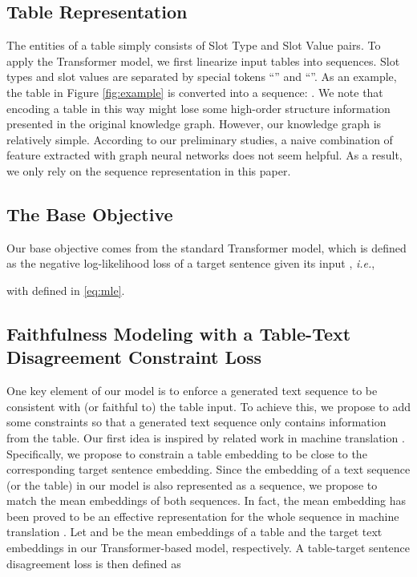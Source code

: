 \documentclass[11pt,a4paper]{article}
\begin{document}
\subsection{Table Representation}
The entities of a table simply consists of Slot Type and Slot Value pairs. 
To apply the Transformer model, we first linearize input tables into sequences. Slot types and slot values are separated by special tokens  ``'' and ``''. As an example, the table in Figure \ref{fig:example} is converted into a sequence: . 
We note that encoding a table in this way might lose some high-order structure information presented in the original knowledge graph. However, our knowledge graph is relatively simple. According to our preliminary studies, a naive combination of feature extracted with graph neural networks \cite{beck2018} does not seem helpful. 
As a result, we only rely on the sequence representation in this paper.

\subsection{The Base Objective}
Our base objective comes from the standard Transformer model, which is defined as the negative log-likelihood loss  of a target sentence  given its input , {\it i.e.},

with  defined in \eqref{eq:mle}.


\subsection {Faithfulness Modeling with a Table-Text Disagreement Constraint Loss}

One key element of our model is to enforce a generated text sequence to be consistent with (or faithful to) the table input. To achieve this, we propose to add some constraints so that a generated text sequence only contains information from the table. Our first idea is inspired by related work in machine translation \cite{sentagree2019}. Specifically, we propose to constrain a table embedding to be close to the corresponding target sentence embedding. Since the embedding of a text sequence (or the table) in our model is also represented as a sequence, we propose to match the mean embeddings of both sequences. In fact, the mean embedding has been proved to be an effective representation for the whole sequence in machine translation \cite{sentagree2019, wang2017}. Let  and  be the mean embeddings of a table and the target text embeddings in our Transformer-based model, respectively. A table-target sentence
disagreement loss  is then defined as
\end{document}
